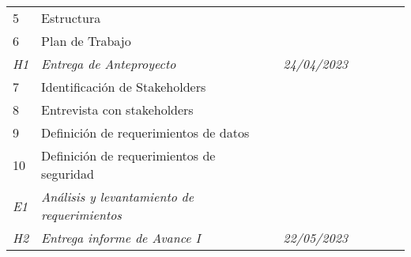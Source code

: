 \begin{longtable}[c]{@{}llllllll@{}}
	5                                      & Estructura                                          &                                              &                                          &               &                &                  &                 \\
	6                                      & Plan de Trabajo                                     &                                              &                                          &               &                &                  &                 \\
	\textit{H1}                            & \textit{Entrega de Anteproyecto}                    & \multicolumn{2}{l}{\textit{24/04/2023}}      & \textit{}                                & \textit{}     & \textit{}      & \textit{}                          \\
	7                                      & Identificación de Stakeholders                      &                                              &                                          &               &                &                  &                 \\
	8                                      & Entrevista con stakeholders                         &                                              &                                          &               &                &                  &                 \\
	9                                      & Definición de requerimientos de datos               &                                              &                                          &               &                &                  &                 \\
	10                                     & Definición de requerimientos de seguridad           &                                              &                                          &               &                &                  &                 \\
	\textit{E1}                            & \textit{Análisis y levantamiento de requerimientos} & \textit{}                                    & \textit{}                                & \textit{}     & \textit{}      & \textit{}        & \textit{}       \\
	\textit{H2}                            & \textit{Entrega informe de Avance I}                & \multicolumn{2}{l}{\textit{22/05/2023}}      & \textit{}                                & \textit{}     & \textit{}      & \textit{}                          \\

\end{longtable}
